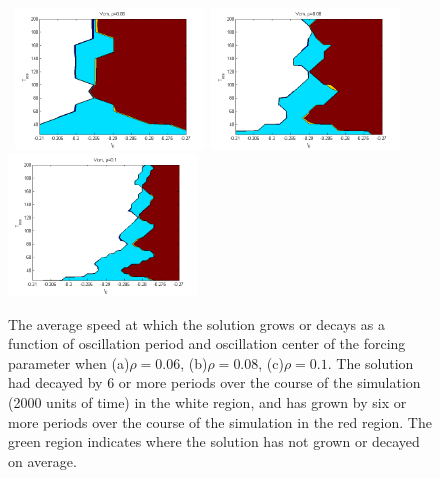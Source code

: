 \documentclass[pre,preprint,superscriptaddress]{revtex4-1}
\begin{document}
\begin{figure}[!htb]
\begin{center}
    \mbox{
\includegraphics[width=50mm]{Vcm006error.png}
\includegraphics[width=50mm]{Vcm008.png}
\includegraphics[width=50mm]{Vcm010.png}
}
\caption{The average speed at which the solution grows or decays as a function of oscillation period and oscillation center of the forcing parameter when (a)$\rho=0.06$, (b)$\rho=0.08$, (c)$\rho=0.1$.  The solution had decayed by 6 or more periods over the course of the simulation (2000 units of time) in the white region, and has grown by six or more periods over the course of the simulation  in the red region.  The green region indicates where the solution has not grown or decayed on average.}
    \label{fig:VcmCompare}
\end{center}
\end{figure}
\end{document}
